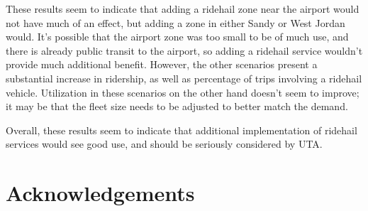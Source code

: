 \documentclass[3p, authoryear]{elsarticle} %
\begin{document}
These results seem to indicate that adding a ridehail zone near the airport would not have much of an effect, but adding a zone in either Sandy or West Jordan would. It's possible that the airport zone was too small to be of much use, and there is already public transit to the airport, so adding a ridehail service wouldn't provide much additional benefit. However, the other scenarios present a substantial increase in ridership, as well as percentage of trips involving a ridehail vehicle. Utilization in these scenarios on the other hand doesn't seem to improve; it may be that the fleet size needs to be adjusted to better match the demand.

Overall, these results seem to indicate that additional implementation of ridehail services would see good use, and should be seriously considered by UTA.

\hypertarget{acknowledgements}{%
\section*{Acknowledgements}\label{acknowledgements}}


\end{document}
